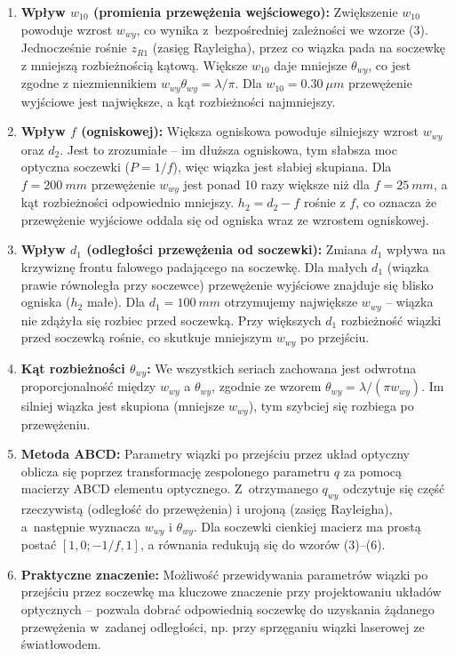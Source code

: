 \documentclass[a4paper,12pt]{article}
\begin{document}
\begin{enumerate}
\item \textbf{Wpływ $w_{10}$ (promienia przewężenia wejściowego):}
  Zwiększenie $w_{10}$ powoduje wzrost $w_{wy}$, co wynika z~bezpośredniej zależności we wzorze (3). Jednocześnie rośnie $z_{R1}$ (zasięg Rayleigha), przez co wiązka pada na soczewkę z mniejszą rozbieżnością kątową. Większe $w_{10}$ daje mniejsze $\theta_{wy}$, co jest zgodne z niezmiennikiem $w_{wy}\theta_{wy} = \lambda/\pi$. Dla $w_{10} = \SI{0,30}{\mu m}$ przewężenie wyjściowe jest największe, a kąt rozbieżności najmniejszy.

\item \textbf{Wpływ $f$ (ogniskowej):}
  Większa ogniskowa powoduje silniejszy wzrost $w_{wy}$ oraz $d_2$. Jest to zrozumiałe -- im dłuższa ogniskowa, tym słabsza moc optyczna soczewki ($P = 1/f$), więc wiązka jest słabiej skupiana. Dla $f = \SI{200}{mm}$ przewężenie $w_{wy}$ jest ponad 10 razy większe niż dla $f = \SI{25}{mm}$, a kąt rozbieżności odpowiednio mniejszy. $h_2 = d_2 - f$ rośnie z $f$, co oznacza że przewężenie wyjściowe oddala się od ogniska wraz ze wzrostem ogniskowej.

\item \textbf{Wpływ $d_1$ (odległości przewężenia od soczewki):}
  Zmiana $d_1$ wpływa na krzywiznę frontu falowego padającego na soczewkę. Dla małych $d_1$ (wiązka prawie równoległa przy soczewce) przewężenie wyjściowe znajduje się blisko ogniska ($h_2$ małe). Dla $d_1 = \SI{100}{mm}$ otrzymujemy największe $w_{wy}$ -- wiązka nie zdążyła się rozbiec przed soczewką. Przy większych $d_1$ rozbieżność wiązki przed soczewką rośnie, co skutkuje mniejszym $w_{wy}$ po przejściu.

\item \textbf{Kąt rozbieżności $\theta_{wy}$:}
  We wszystkich seriach zachowana jest odwrotna proporcjonalność między $w_{wy}$ a $\theta_{wy}$, zgodnie ze wzorem $\theta_{wy} = \lambda/(\pi w_{wy})$. Im silniej wiązka jest skupiona (mniejsze $w_{wy}$), tym szybciej się rozbiega po przewężeniu.

\item \textbf{Metoda ABCD:}
  Parametry wiązki po przejściu przez układ optyczny oblicza się poprzez transformację zespolonego parametru $q$ za pomocą macierzy ABCD elementu optycznego. Z~otrzymanego $q_{wy}$ odczytuje się część rzeczywistą (odległość do przewężenia) i urojoną (zasięg Rayleigha), a~następnie wyznacza $w_{wy}$ i $\theta_{wy}$. Dla soczewki cienkiej macierz ma prostą postać $[1,0; -1/f, 1]$, a równania redukują się do wzorów (3)--(6).

\item \textbf{Praktyczne znaczenie:}
  Możliwość przewidywania parametrów wiązki po przejściu przez soczewkę ma kluczowe znaczenie przy projektowaniu układów optycznych -- pozwala dobrać odpowiednią soczewkę do uzyskania żądanego przewężenia w~zadanej odległości, np. przy sprzęganiu wiązki laserowej ze światłowodem.
\end{enumerate}
\end{document}
